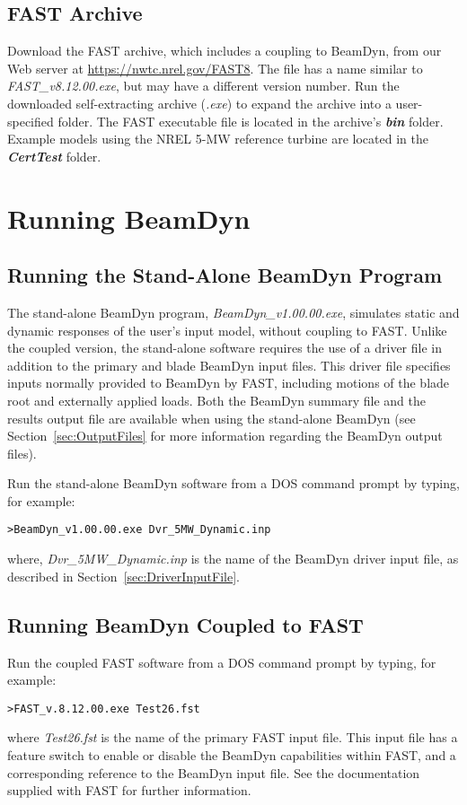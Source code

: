 \subsection{FAST Archive}
Download the FAST archive, which includes a coupling to BeamDyn, from our Web server at \url{https://nwtc.nrel.gov/FAST8}. The file has a name similar to \textit{FAST\_v8.12.00.exe}, but may have a different version number. Run the downloaded self-extracting archive ({\it .exe}) to expand the archive into a user-specified folder. The FAST executable file is located in the archive's \textbf{{\it bin}} folder. Example models using the NREL 5-MW reference turbine are located in the \textbf{{\it CertTest}} folder.

\section{Running BeamDyn}
\subsection{Running the Stand-Alone BeamDyn Program}
The stand-alone BeamDyn program, {\it BeamDyn\_v1.00.00.exe}, simulates static and dynamic responses of the user's input model, without coupling to FAST. Unlike the coupled version, the stand-alone software requires the use of a driver file in addition to the primary  and blade BeamDyn input files. This driver file specifies inputs normally provided to BeamDyn by FAST, including motions of the blade root and externally applied loads. Both the BeamDyn summary file and the results output file are available when using the stand-alone BeamDyn (see Section~\ref{sec:OutputFiles} for more information regarding the BeamDyn output files).

Run the stand-alone BeamDyn software from a DOS command prompt by typing, for example:
\begin{verbatim}
>BeamDyn_v1.00.00.exe Dvr_5MW_Dynamic.inp
\end{verbatim}
where, {\it Dvr\_5MW\_Dynamic.inp} is the name of the BeamDyn driver input file, as described in Section~\ref{sec:DriverInputFile}.

\subsection{Running BeamDyn Coupled to FAST}
Run the coupled FAST software from a DOS command prompt by typing, for example:
\begin{verbatim}
>FAST_v.8.12.00.exe Test26.fst
\end{verbatim}
where {\it Test26.fst} is the name of the primary FAST input file. This input file has a feature switch to enable or disable the BeamDyn capabilities within FAST, and a corresponding reference to the BeamDyn input file. See the documentation supplied with FAST for further information.




